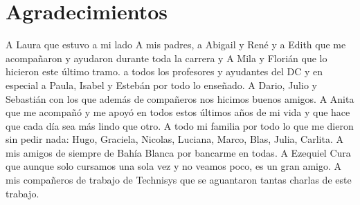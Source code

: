 \chapter*{Agradecimientos}

\noindent A Laura que estuvo a mi lado
\noindent A mis padres, a Abigail y René y a Edith que me acompañaron y ayudaron durante toda la carrera y A Mila y Florián que lo hicieron este último tramo. 
\noindent a todos los profesores y ayudantes del DC y en especial a Paula, Isabel y Estebán por todo lo enseñado.
\noindent A Dario, Julio y Sebastián con los que además de compañeros nos hicimos buenos amigos.
\noindent A Anita que me acompañó y me apoyó en todos estos últimos años de mi vida y que hace que cada día sea más lindo que otro.
\noindent A todo mi familia por todo lo que me dieron sin pedir nada: Hugo, Graciela, Nicolas, Luciana, Marco, Blas, Julia, Carlita.
\noindent A mis amigos de siempre de Bahía Blanca por bancarme en todas.
\noindent A Ezequiel Cura que aunque solo cursamos una sola vez y no veamos poco, es un gran amigo.
\noindent A mis compañeros de trabajo de Technisys que se aguantaron tantas charlas de este trabajo.